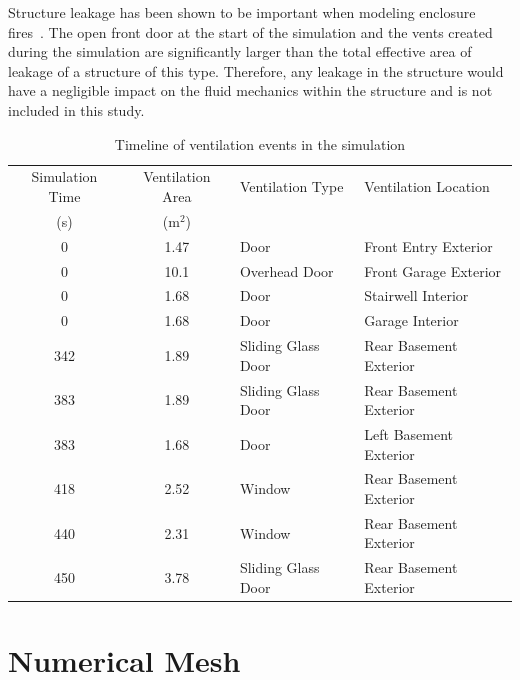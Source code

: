 \documentclass[12pt,oneside]{book}
\begin{document}
Structure leakage has been shown to be important when modeling enclosure fires~\cite{beal2009}. The open front door at the start of the simulation and the vents created during the simulation are significantly larger than the total effective area of leakage of a structure of this type. Therefore, any leakage in the structure would have a negligible impact on the fluid mechanics within the structure and is not included in this study.

\begin{table}[!ht]
\caption[Timeline of ventilation events in the simulation]{Timeline of ventilation events in the simulation}
\begin{tabular}{ccll}
\toprule
Simulation Time      &  Ventilation Area  &  Ventilation Type    &  Ventilation Location     \\
{(s)}                &  (m$^2$)           &                      &                           \\
\midrule
0                    &  1.47              &  Door                &  Front Entry Exterior     \\
0                    &  10.1              &  Overhead Door       &  Front Garage Exterior    \\
0                    &  1.68              &  Door                &  Stairwell Interior       \\
0                    &  1.68              &  Door                &  Garage Interior          \\
342                  &  1.89              &  Sliding Glass Door  &  Rear Basement Exterior   \\
383                  &  1.89              &  Sliding Glass Door  &  Rear Basement Exterior   \\
383                  &  1.68              &  Door                &  Left Basement Exterior   \\
418                  &  2.52              &  Window              &  Rear Basement Exterior   \\
440                  &  2.31              &  Window              &  Rear Basement Exterior   \\
450                  &  3.78              &  Sliding Glass Door  &  Rear Basement Exterior   \\
\bottomrule
\end{tabular}
\label{tab:ventilation_timeline}
\end{table}

\section{Numerical Mesh}
\label{sec:numerical_mesh}
\end{document}
